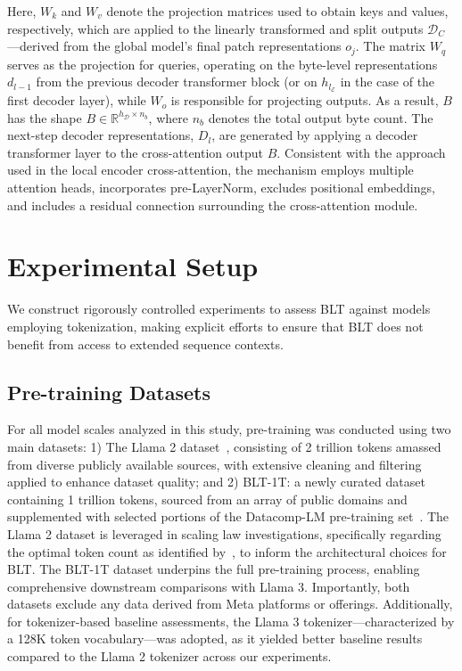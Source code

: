 Here, $W_k$ and $W_v$ denote the projection matrices used to obtain keys and values, respectively, which are applied to the linearly transformed and split outputs $\mathcal{D}_C$—derived from the global model’s final patch representations $o_j$. The matrix $W_q$ serves as the projection for queries, operating on the byte-level representations $d_{l-1}$ from the previous decoder transformer block (or on $h_{l_{\mathcal{E}}}$ in the case of the first decoder layer), while $W_o$ is responsible for projecting outputs. As a result, $B$ has the shape $B \in \mathbb{R}^{h_{\mathcal{D}} \times n_b}$, where $n_b$ denotes the total output byte count. The next-step decoder representations, $D_l$, are generated by applying a decoder transformer layer to the cross-attention output $B$. Consistent with the approach used in the local encoder cross-attention, the mechanism employs multiple attention heads, incorporates pre-LayerNorm, excludes positional embeddings, and includes a residual connection surrounding the cross-attention module.

\section{Experimental Setup}
\label{section:experiments}
We construct rigorously controlled experiments to assess {\textsc BLT} against models employing tokenization, making explicit efforts to ensure that {\textsc BLT} does not benefit from access to extended sequence contexts.

\subsection{Pre-training Datasets} For all model scales analyzed in this study, pre-training was conducted using two main datasets: 1) The Llama 2 dataset~\citep{touvron2023llama}, consisting of 2 trillion tokens amassed from diverse publicly available sources, with extensive cleaning and filtering applied to enhance dataset quality; and 2) {\textsc BLT}-1T: a newly curated dataset containing 1 trillion tokens, sourced from an array of public domains and supplemented with selected portions of the Datacomp-LM pre-training set~\citep{li2024datacomp}. The Llama 2 dataset is leveraged in scaling law investigations, specifically regarding the optimal token count as identified by~\cite{dubey2024llama}, to inform the architectural choices for {\textsc BLT}. The {\textsc BLT}-1T dataset underpins the full pre-training process, enabling comprehensive downstream comparisons with Llama 3. Importantly, both datasets exclude any data derived from Meta platforms or offerings. Additionally, for tokenizer-based baseline assessments, the Llama 3 tokenizer—characterized by a 128K token vocabulary—was adopted, as it yielded better baseline results compared to the Llama 2 tokenizer across our experiments.

